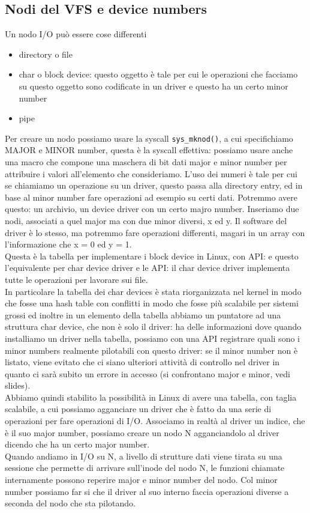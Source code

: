 \documentclass[12pt, oneside]{extbook}
\begin{document}
\subsection{Nodi del VFS e device numbers}
Un nodo I/O può essere cose differenti
\begin{itemize}
\item directory o file
\item char o block device: questo oggetto è tale per cui le operazioni che facciamo su questo oggetto sono codificate in un driver e questo ha un certo minor number
\item pipe
\end{itemize}
Per creare un nodo possiamo usare la syscall \texttt{sys\_mknod()}, a cui specifichiamo MAJOR e MINOR number, questa è la syscall effettiva:
possiamo usare anche una macro che compone una maschera di bit dati major e minor number per attribuire i valori all'elemento che consideriamo. L'uso dei numeri è tale per cui se chiamiamo un operazione su un driver, questo passa alla directory entry, ed in base al minor number fare operazioni ad esempio su certi dati. Potremmo avere questo: un archivio, un device driver con un certo majro number. Inseriamo due nodi, associati a quel major ma con due minor diversi, x ed y. Il software del driver è lo stesso, ma potremmo fare operazioni differenti, magari in un array con l'informazione che x = 0 ed y = 1.\\Questa è la tabella per implementare i block device in Linux, con API:
e questo l'equivalente per char device driver e le API:
il char device driver implementa tutte le operazioni per lavorare sui file.\\In particolare la tabella dei char devices è stata riorganizzata nel kernel in modo che fosse una hash table con conflitti in modo che fosse più scalabile per sistemi grossi ed inoltre in un elemento della tabella abbiamo un puntatore ad una struttura char device, che non è solo il driver:
ha delle informazioni dove quando installiamo un driver nella tabella, possiamo con una API registrare quali sono i minor numbers realmente pilotabili con questo driver: se il minor number non è listato, viene evitato che ci siano ulteriori attività di controllo nel driver in quanto ci sarà subito un errore in accesso (si confrontano major e minor, vedi slides).\\Abbiamo quindi stabilito la possibilità in Linux di avere una tabella, con taglia scalabile, a cui possiamo agganciare un driver che è fatto da una serie di operazioni per fare operazioni di I/O. Associamo in realtà al driver un indice, che è il suo major number, possiamo creare un nodo N agganciandolo al driver dicendo che ha un certo major number.\\Quando andiamo in I/O su N, a livello di strutture dati viene tirata su una sessione che permette di arrivare sull'inode del nodo N, le funzioni chiamate internamente possono reperire major e minor number del nodo. Col minor number possiamo far si che il driver al suo interno faccia operazioni diverse a seconda del nodo che sta pilotando.
\end{document}
